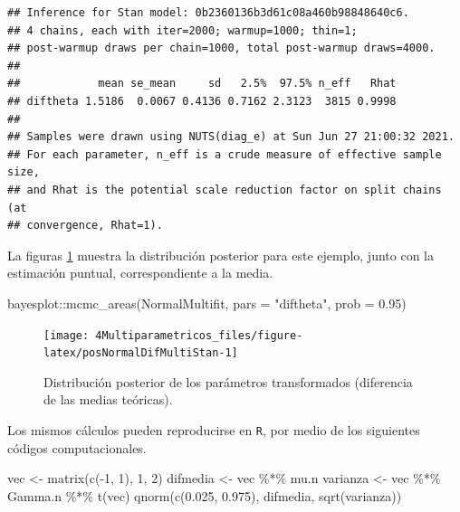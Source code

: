 \documentclass[
  10pt,
  spanish,
]{book}
\newenvironment{Shaded}{\begin{snugshade}}{\end{snugshade}}
\newcommand{\AttributeTok}[1]{\textcolor[rgb]{0.77,0.63,0.00}{#1}}
\newcommand{\DecValTok}[1]{\textcolor[rgb]{0.00,0.00,0.81}{#1}}
\newcommand{\FloatTok}[1]{\textcolor[rgb]{0.00,0.00,0.81}{#1}}
\newcommand{\FunctionTok}[1]{\textcolor[rgb]{0.00,0.00,0.00}{#1}}
\newcommand{\NormalTok}[1]{#1}
\newcommand{\OtherTok}[1]{\textcolor[rgb]{0.56,0.35,0.01}{#1}}
\newcommand{\SpecialCharTok}[1]{\textcolor[rgb]{0.00,0.00,0.00}{#1}}
\newcommand{\StringTok}[1]{\textcolor[rgb]{0.31,0.60,0.02}{#1}}
\theoremstyle{definition}
\theoremstyle{definition}
\theoremstyle{definition}
\theoremstyle{definition}
\theoremstyle{remark}
\begin{document}
\begin{verbatim}
## Inference for Stan model: 0b2360136b3d61c08a460b98848640c6.
## 4 chains, each with iter=2000; warmup=1000; thin=1; 
## post-warmup draws per chain=1000, total post-warmup draws=4000.
## 
##            mean se_mean     sd   2.5%  97.5% n_eff   Rhat
## diftheta 1.5186  0.0067 0.4136 0.7162 2.3123  3815 0.9998
## 
## Samples were drawn using NUTS(diag_e) at Sun Jun 27 21:00:32 2021.
## For each parameter, n_eff is a crude measure of effective sample size,
## and Rhat is the potential scale reduction factor on split chains (at 
## convergence, Rhat=1).
\end{verbatim}

La figuras \ref{fig:posNormalDifMultiStan} muestra la distribución posterior para este ejemplo, junto con la estimación puntual, correspondiente a la media.

\begin{Shaded}
\begin{Highlighting}[]
\NormalTok{bayesplot}\SpecialCharTok{::}\FunctionTok{mcmc\_areas}\NormalTok{(NormalMultifit, }\AttributeTok{pars =} \StringTok{"diftheta"}\NormalTok{, }
                      \AttributeTok{prob =} \FloatTok{0.95}\NormalTok{)}
\end{Highlighting}
\end{Shaded}

\begin{figure}

{\centering \texttt{[image: 4Multiparametricos\_files/figure-latex/posNormalDifMultiStan-1]} 

}

\caption{Distribución posterior de los parámetros transformados (diferencia de las medias teóricas).}\label{fig:posNormalDifMultiStan}
\end{figure}

Los mismos cálculos pueden reproducirse en \texttt{R}, por medio de los siguientes códigos computacionales.

\begin{Shaded}
\begin{Highlighting}[]
\NormalTok{vec }\OtherTok{\textless{}{-}} \FunctionTok{matrix}\NormalTok{(}\FunctionTok{c}\NormalTok{(}\SpecialCharTok{{-}}\DecValTok{1}\NormalTok{, }\DecValTok{1}\NormalTok{), }\DecValTok{1}\NormalTok{, }\DecValTok{2}\NormalTok{)}
\NormalTok{difmedia }\OtherTok{\textless{}{-}}\NormalTok{ vec }\SpecialCharTok{\%*\%}\NormalTok{ mu.n}
\NormalTok{varianza }\OtherTok{\textless{}{-}}\NormalTok{ vec }\SpecialCharTok{\%*\%}\NormalTok{ Gamma.n }\SpecialCharTok{\%*\%} \FunctionTok{t}\NormalTok{(vec)}
\FunctionTok{qnorm}\NormalTok{(}\FunctionTok{c}\NormalTok{(}\FloatTok{0.025}\NormalTok{, }\FloatTok{0.975}\NormalTok{), difmedia, }\FunctionTok{sqrt}\NormalTok{(varianza))}
\end{Highlighting}
\end{Shaded}
\end{document}
